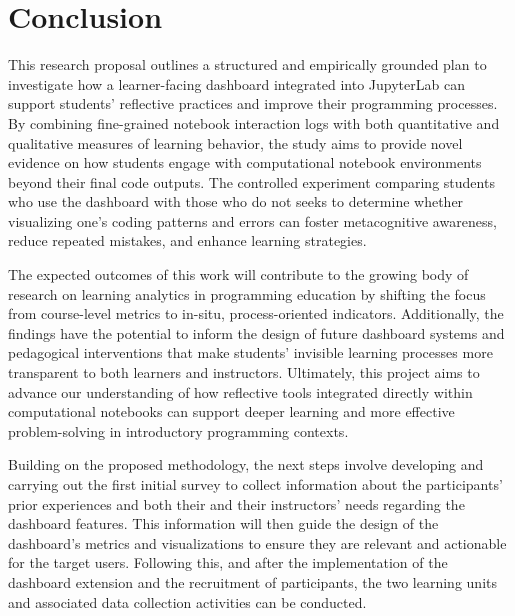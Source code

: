 \section{Conclusion}

This research proposal outlines a structured and empirically grounded plan to investigate how a learner-facing dashboard integrated into JupyterLab can support students' reflective practices and improve their programming processes. By combining fine-grained notebook interaction logs with both quantitative and qualitative measures of learning behavior, the study aims to provide novel evidence on how students engage with computational notebook environments beyond their final code outputs. The controlled experiment comparing students who use the dashboard with those who do not seeks to determine whether visualizing one's coding patterns and errors can foster metacognitive awareness, reduce repeated mistakes, and enhance learning strategies.

The expected outcomes of this work will contribute to the growing body of research on learning analytics in programming education by shifting the focus from course-level metrics to in-situ, process-oriented indicators. Additionally, the findings have the potential to inform the design of future dashboard systems and pedagogical interventions that make students' invisible learning processes more transparent to both learners and instructors. Ultimately, this project aims to advance our understanding of how reflective tools integrated directly within computational notebooks can support deeper learning and more effective problem-solving in introductory programming contexts.


Building on the proposed methodology, the next steps involve developing and carrying out the first initial survey to collect information about the participants' prior experiences and both their and their instructors' needs regarding the dashboard features. This information will then guide the design of the dashboard's metrics and visualizations to ensure they are relevant and actionable for the target users. Following this, and after the implementation of the dashboard extension and the recruitment of participants, the two learning units and associated data collection activities can be conducted.